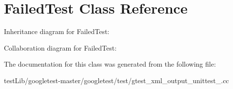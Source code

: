 \hypertarget{classFailedTest}{}\section{Failed\+Test Class Reference}
\label{classFailedTest}


Inheritance diagram for Failed\+Test\+:


Collaboration diagram for Failed\+Test\+:


The documentation for this class was generated from the following file\+:\begin{DoxyCompactItemize}
\item 
test\+Lib/googletest-\/master/googletest/test/gtest\+\_\+xml\+\_\+output\+\_\+unittest\+\_\+.\+cc\end{DoxyCompactItemize}
